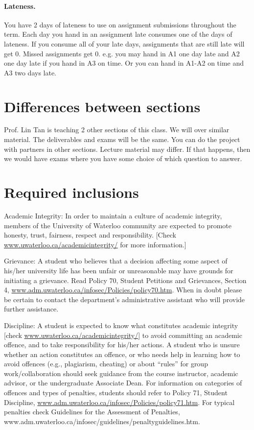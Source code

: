 \documentclass{article}
\begin{document}
\paragraph{Lateness.} You have 2 days of lateness to use on assignment 
submissions throughout the term. Each day you hand in an assignment
late consumes one of the days of lateness. If you consume all of your
late days, assignments that are still late will get 0. Missed assignments get 0.
e.g. you may hand in A1 one day late and A2 one day late if
you hand in A3 on time.  Or you can hand in A1-A2 on time and
A3 two days late.

\section*{Differences between sections}
Prof. Lin Tan is teaching 2 other sections of this class. We will
over similar material. The deliverables and exams will be
the same.  You can do the project with partners in other sections.
Lecture material may differ. If that happens, then we would have
exams where you have some choice of which question to answer.

\section*{Required inclusions}
\small \vspace*{-1em}
Academic Integrity: In order to maintain a culture of academic
integrity, members of the University of Waterloo community are
expected to promote honesty, trust, fairness, respect and
responsibility. [Check \url{www.uwaterloo.ca/academicintegrity/} for more
  information.]

\noindent
Grievance: A student who believes that a decision affecting some
aspect of his/her university life has been unfair or unreasonable may
have grounds for initiating a grievance. Read Policy 70, Student
Petitions and Grievances, Section 4,
\url{www.adm.uwaterloo.ca/infosec/Policies/policy70.htm}.  When in doubt
please be certain to contact the department’s administrative assistant
who will provide further assistance.

\noindent
Discipline: A student is expected to know what constitutes academic
integrity [check \url{www.uwaterloo.ca/academicintegrity/}] to avoid
committing an academic offence, and to take responsibility for his/her
actions. A student who is unsure whether an action constitutes an
offence, or who needs help in learning how to avoid offences (e.g.,
plagiarism, cheating) or about “rules” for group work/collaboration
should seek guidance from the course instructor, academic advisor, or
the undergraduate Associate Dean. For information on categories of
offences and types of penalties, students should refer to Policy 71,
Student Discipline,
\url{www.adm.uwaterloo.ca/infosec/Policies/policy71.htm}. For typical
penalties check Guidelines for the Assessment of Penalties,
www.adm.uwaterloo.ca/infosec/guidelines/penaltyguidelines.htm.
\end{document}

